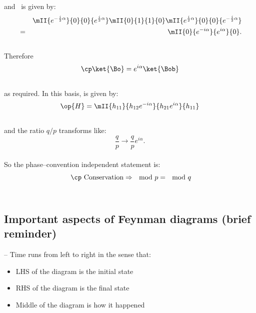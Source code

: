 and \cp\ is given by:\\
{\footnotesize
\begin{eqnarray}
&& \mII{ e^{-\frac{i}{2}\alpha} }{ 0 }{ 0 }{ e^{ \frac{i}{2}\alpha} }
        \mII{     0         }{ 1 }{ 1 }{        0        }
        \mII{ e^{\frac{i}{2}\alpha}}{ 0 }{ 0 }{ e^{
        -\frac{i}{2}\alpha}  }
\nonumber\\
   &=&  \mII{ 0 }{e^{-i\alpha}   }{ e^{ i\alpha}   }{0}
.
\end{eqnarray}}\\
Therefore 
\begin{equation}
\cp \ket{\Bo} = e^{i\alpha}\ket{\Bob}
\end{equation}\\
as required. In this basis,  is given
by:\\
\begin{equation}
\op{H}=
 \mII{ h_{11}             }{  h_{12} e^{-i\alpha} }{
       h_{21} e^{i\alpha} }{  h_{11}              }
\end{equation}\\
and the ratio $q/p$ transforms like:
\begin{equation}
\frac{q}{p} \to \frac{q}{p} e^{i\alpha}
.
\end{equation}\\
So the phase--convention independent statement is:
\begin{equation}
\label{eq:th.a.qpmixing}
\mbox{ \cp\ Conservation} \Rightarrow \mod{p}=\mod{q}
\end{equation}\\

\subsection{Important aspects of Feynman diagrams (brief reminder)}

-- Time runs from left to right in the sense that:
\begin{itemize}
\item LHS of the diagram is the initial state
\item RHS of the diagram is the final state
\item Middle of the diagram is how it happened
\end{itemize}

